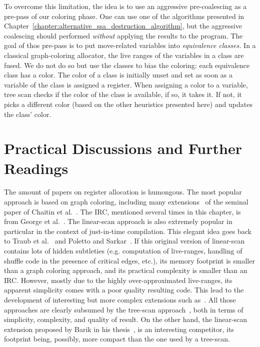 {To overcome this limitation, the idea is to use an aggressive pre-coalescing as a pre-pass of our coloring phase.
One can use one of the algorithms presented in Chapter~\ref{chapter:alternative_ssa_destruction_algorithm}, but the aggressive coalescing should performed \emph{without} applying the results to the program.
The goal of thos pre-pass is to put move-related variables into \emph{equivalence classes.}
In a classical graph-coloring allocator, the live ranges of the variables in a class are fused.
We do not do so but use the classes to bias the coloring:
each equivalence class has a color. 
The color of a class is initially unset and set as soon as a variable of the class is assigned a register.
When assigning a color to a variable, tree scan checks if the color of the class is available, if so, it takes it. 
If not, it picks a different color (based on the other heuristics presented here) and updates the class' color. 

\section{Practical Discussions and Further Readings}
\label{sec:practical-regalloc}

The amount of papers on register allocation is humongous.
The most popular approach is based on graph coloring, including many extensions~\cite{chow1990priority,park2004optimistic,Lueh:2000} of the seminal paper of Chaitin et al.~\cite{chaitin:1981:register}.
The IRC, mentioned several times in this chapter, is from George et al.~\cite{george:96:iterated}.
The linear-scan approach is also extremely popular in particular in the context of just-in-time compilation.
This elegant idea goes back to Traub et al.~\cite{traub1998quality} and Poletto and Sarkar~\cite{Poletto99}.
If this original version of linear-scan contains lots of hidden subtleties (e.g. computation of live-ranges, handling of shuffle code in the presence of critical edges, etc.), its memory footprint is smaller than a graph coloring approach, and its practical complexity is smaller than an IRC.
However, mostly due to the highly over-approximated live-ranges, its apparent simplicity comes with a poor quality resulting code.
This lead to the development of interesting but more complex extensions such as~\cite{wimmer2005optimized,sarkar2007extended}.
All those approaches are clearly subsumed by the tree-scan approach~\cite{ColombetOct11}, both in terms of simplicity, complexity, and quality of result. 
On the other hand, the linear-scan extension proposed by Barik in his thesis~\cite{barik2010efficient}, is an interesting competitor, its footprint being, possibly, more compact than the one used by a tree-scan.

}
